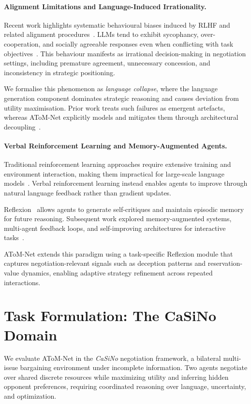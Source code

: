\documentclass[11pt]{article}
\begin{document}
\paragraph{Alignment Limitations and Language-Induced Irrationality.}
Recent work highlights systematic behavioural biases induced by RLHF and related alignment procedures~\cite{rlhf,constitutionalai}. LLMs tend to exhibit sycophancy, over-cooperation, and socially agreeable responses even when conflicting with task objectives~\cite{alignmenttax}. This behaviour manifests as irrational decision-making in negotiation settings, including premature agreement, unnecessary concession, and inconsistency in strategic positioning.

We formalise this phenomenon as \textit{language collapse}, where the language generation component dominates strategic reasoning and causes deviation from utility maximisation. Prior work treats such failures as emergent artefacts, whereas AToM-Net explicitly models and mitigates them through architectural decoupling~\cite{decoupling}.

\paragraph{Verbal Reinforcement Learning and Memory-Augmented Agents.}
Traditional reinforcement learning approaches require extensive training and environment interaction, making them impractical for large-scale language models~\cite{emergentcomm}. Verbal reinforcement learning instead enables agents to improve through natural language feedback rather than gradient updates.

Reflexion~\cite{reflexion} allows agents to generate self-critiques and maintain episodic memory for future reasoning. Subsequent work explored memory-augmented systems, multi-agent feedback loops, and self-improving architectures for interactive tasks~\cite{selfrefine,generativeagents,multiagentllm}.

AToM-Net extends this paradigm using a task-specific Reflexion module that captures negotiation-relevant signals such as deception patterns and reservation-value dynamics, enabling adaptive strategy refinement across repeated interactions.

\section{Task Formulation: The CaSiNo Domain}

We evaluate AToM-Net in the \textit{CaSiNo} negotiation framework, a bilateral multi-issue bargaining environment under incomplete information. Two agents negotiate over shared discrete resources while maximizing utility and inferring hidden opponent preferences, requiring coordinated reasoning over language, uncertainty, and optimization.
\end{document}
